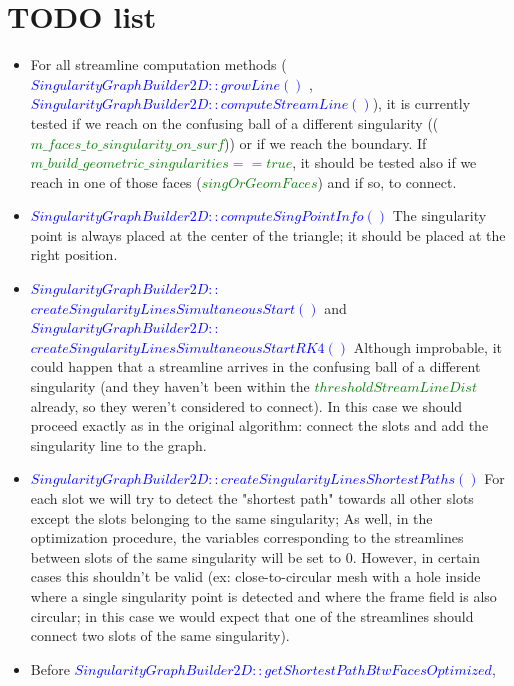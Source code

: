 \documentclass[a4paper]{report}
\begin{document}
\section{TODO list}
{ 

\begin{itemize}
\item For all streamline computation methods (\textcolor{blue}{$SingularityGraphBuilder2D::growLine()$} , \textcolor{blue}{$SingularityGraphBuilder2D::computeStreamLine()$}), it is currently tested if we reach on the confusing ball of a different singularity ((\textcolor{green}{$m\_faces\_to\_singularity\_on\_surf$})) or if we reach the boundary.
If \textcolor{green}{$m\_build\_geometric\_singularities==true$}, it should be tested also if we reach in one of those faces (\textcolor{green}{$singOrGeomFaces$}) and if so, to connect.
\newline
\item \textcolor{blue}{$SingularityGraphBuilder2D::computeSingPointInfo()$} 
The singularity point is always placed at the center of the triangle; it should be placed at the right position.
\newline
\item \textcolor{blue}{$SingularityGraphBuilder2D::$} \textcolor{blue}{$createSingularityLinesSimultaneousStart()$} and \textcolor{blue}{$SingularityGraphBuilder2D::$} \textcolor{blue}{$ createSingularityLinesSimultaneousStartRK4()$}
Although improbable, it could happen that a streamline arrives in the confusing ball of a different singularity (and they haven't been within the \textcolor{green}{$thresholdStreamLineDist$} already, so they weren't considered to connect). In this case we should proceed exactly as in the original algorithm: connect the slots and add the singularity line to the graph.
\newline
\item \textcolor{blue}{$SingularityGraphBuilder2D::createSingularityLinesShortestPaths()$} 
For each slot we will try to detect the "shortest path" towards all other slots except the slots belonging to the same singularity; As well, in the optimization procedure, the variables corresponding to the streamlines between slots of the same singularity will be set to $0$. However, in certain cases this shouldn't be valid (ex: close-to-circular mesh with a hole inside where a single singularity point is detected and where the frame field is also circular; in this case we would expect that one of the streamlines should connect two slots of the same singularity).
\item  Before \textcolor{blue}{$SingularityGraphBuilder2D::getShortestPathBtwFacesOptimized$}, 

\end{itemize}}
\end{document}
